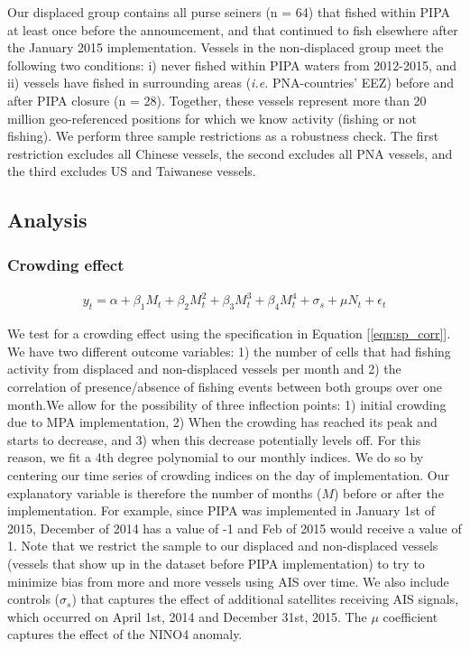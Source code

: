 \documentclass[9p,twocolumn,twoside,lineno]{pnas-new}
\begin{document}
\begin{scriptsize}
Our displaced group contains all purse seiners (n = 64) that fished within PIPA at least once before the announcement, and that continued to fish elsewhere after the January 2015 implementation. Vessels in the non-displaced group meet the following two conditions: i) never fished within PIPA waters from 2012-2015, and ii) vessels have fished in surrounding areas (\emph{i.e.} PNA-countries' EEZ) before and after PIPA closure (n = 28). Together, these vessels represent more than 20 million geo-referenced positions for which we know activity (fishing or not fishing). We perform three sample restrictions as a robustness check. The first restriction excludes all Chinese vessels, the second excludes all PNA vessels, and the third excludes US and Taiwanese vessels. 

\subsection{Analysis}

\subsubsection{Crowding effect}

\begin{figure}[H]
	\begin{align}
	y_t = \alpha + \beta_1 M_t + \beta_2 M_t^2 + \beta_3 M_t^3 + \beta_4 M_t ^4 + \sigma_s + \mu N_t + \epsilon_t
	\label{eqn:sp_corr}
	\end{align}
\end{figure}

We test for a crowding effect using the specification in Equation [\ref{eqn:sp_corr}]. We have two different outcome variables:
1) the number of cells that had fishing activity from displaced and non-displaced vessels per month and 2) the correlation of presence/absence of fishing events between both groups over one month.We allow for the possibility of three inflection points: 1) initial crowding due to MPA implementation, 2) When the crowding has reached its peak and starts to decrease, and 3) when this decrease potentially levels off. For this reason, we fit a 4th degree polynomial to our monthly indices. We do so by centering our time series of crowding indices on the day of implementation. Our explanatory variable is therefore the number of months ($M$) before or after the implementation. For example, since PIPA was implemented in January 1st of 2015, December of 2014 has a value of -1 and Feb of 2015 would receive a value of 1. Note that we restrict the sample to our displaced and non-displaced vessels (vessels that show up in the dataset before PIPA implementation) to try to minimize bias from more and more vessels using AIS over time. We also include controls ($\sigma_s$) that captures the effect of additional satellites receiving AIS signals, which occurred on April 1st, 2014 and December 31st, 2015. The $\mu$ coefficient captures the effect of the NINO4 anomaly.


\end{scriptsize}
\end{document}
